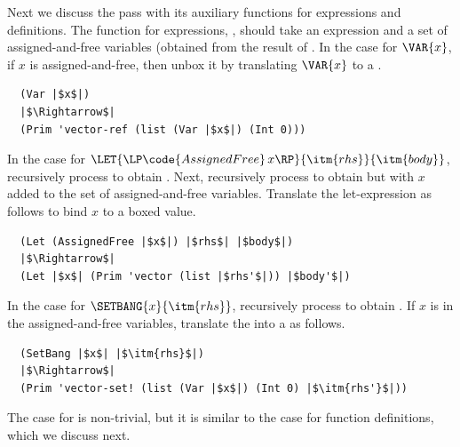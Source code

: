 \documentclass[11pt]{book}
\begin{document}
Next we discuss the  pass with its auxiliary
functions for expressions and definitions. The function for
expressions, , should take an expression and a
set of assigned-and-free variables (obtained from the result of
. In the case for $\VAR{x}$, if $x$ is
assigned-and-free, then unbox it by translating $\VAR{x}$ to a
.
\begin{lstlisting}
  (Var |$x$|)
  |$\Rightarrow$|
  (Prim 'vector-ref (list (Var |$x$|) (Int 0)))
\end{lstlisting}
%
In the case for $\LET{\LP\code{AssignedFree}\,
  x\RP}{\itm{rhs}}{\itm{body}}$, recursively process  to
obtain .  Next, recursively process  to obtain
 but with $x$ added to the set of assigned-and-free
variables.  Translate the let-expression as follows to bind $x$ to a
boxed value.
\begin{lstlisting}
  (Let (AssignedFree |$x$|) |$rhs$| |$body$|)
  |$\Rightarrow$|
  (Let |$x$| (Prim 'vector (list |$rhs'$|)) |$body'$|)
\end{lstlisting}
%
In the case for $\SETBANG{x}{\itm{rhs}}$, recursively process
 to obtain .  If $x$ is in the assigned-and-free
variables, translate the  into a 
as follows.
\begin{lstlisting}
  (SetBang |$x$| |$\itm{rhs}$|)
  |$\Rightarrow$|
  (Prim 'vector-set! (list (Var |$x$|) (Int 0) |$\itm{rhs'}$|))
\end{lstlisting}
%
The case for  is non-trivial, but it is similar to the
case for function definitions, which we discuss next.
\end{document}
